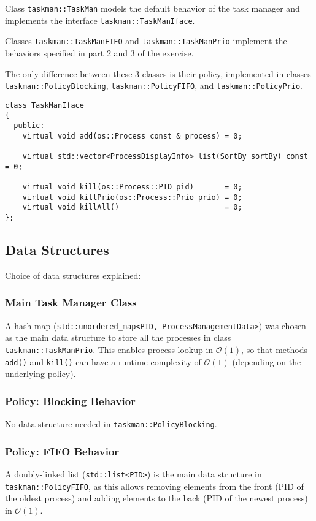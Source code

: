 \documentclass[a4paper]{scrartcl}
\newcommand{\bigo}[1]{\ensuremath{\mathcal{O}\left(#1\right)}}
\begin{document}
Class \texttt{taskman::TaskMan} models the default behavior of the task manager and implements the interface \texttt{taskman::TaskManIface}.

Classes \texttt{taskman::TaskManFIFO} and \texttt{taskman::TaskManPrio} implement the behaviors specified in part 2 and 3 of the exercise.

The only difference between these 3 classes is their policy, implemented in classes \texttt{taskman::PolicyBlocking}, \texttt{taskman::PolicyFIFO}, and \texttt{taskman::PolicyPrio}.

\begin{verbatim}
class TaskManIface
{
  public:
    virtual void add(os::Process const & process) = 0;

    virtual std::vector<ProcessDisplayInfo> list(SortBy sortBy) const = 0;

    virtual void kill(os::Process::PID pid)       = 0;
    virtual void killPrio(os::Process::Prio prio) = 0;
    virtual void killAll()                        = 0;
};
\end{verbatim}


\subsection{Data Structures}
Choice of data structures explained:

\subsubsection{Main Task Manager Class}
A hash map (\texttt{std::unordered_map<PID, ProcessManagementData>}) was chosen as the main data structure to store all the processes in class \texttt{taskman::TaskManPrio}.
This enables process lookup in \bigo{1}, so that methods \texttt{add()} and \texttt{kill()} can have a runtime complexity of \bigo{1} (depending on the underlying policy).

\subsubsection{Policy: Blocking Behavior}
No data structure needed in \texttt{taskman::PolicyBlocking}.

\subsubsection{Policy: FIFO Behavior}
A doubly-linked list (\texttt{std::list<PID>}) is the main data structure in \texttt{taskman::PolicyFIFO}, as this allows removing elements from the front (PID of the oldest process) and adding elements to the back (PID of the newest process) in \bigo{1}.
\end{document}
